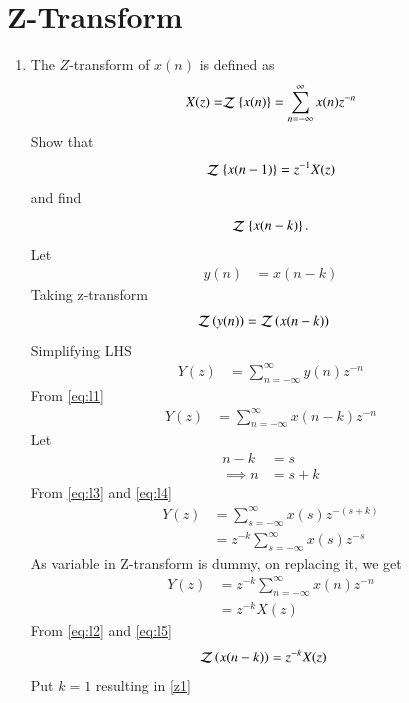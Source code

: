 \documentclass[journal,12pt,twocolumn]{IEEEtran}
\newcommand{\systemZ}[1]{\stackrel{#1}{\mathcal{Z}}}
\theoremstyle{remark}
\begin{document}
\section{Z-Transform}

\begin{enumerate}[label=\thesection.\arabic*]
\item The $Z$-transform of $x(n)$ is defined as
\begin{equation}
X(z)=\systemZ{}\cbrak{x(n)}=\sum _{n=-\infty }^{\infty }x(n)z^{-n} \label{z-transform}
\end{equation}
Show that
\begin{equation}
\systemZ{} \cbrak{x(n-1)} = z^{-1}X(z) \label{z1}
\end{equation}
and find
\begin{equation}
	\systemZ{} \cbrak{x(n-k)}. 
\end{equation}
\solution 
Let
\begin{align}
y(n) &= x(n-k) \label{eq:l1}
\end{align}
Taking z-transform
\begin{align}
\mathcal{Z}\left(y(n)\right) &= \mathcal{Z}\left(x(n-k)\right) \label{eq:l2}
\end{align}
Simplifying LHS
\begin{align}
Y(z) &= \sum_{n=-\infty}^{\infty} y(n)z^{-n} 
\end{align}
From \eqref{eq:l1}
\begin{align}
Y(z) &= \sum_{n=-\infty}^{\infty} x(n-k) z^{-n} \label{eq:l3}
\end{align}
Let 
\begin{align}
n-k &= s  \\\implies
n &= s+k \label{eq:l4}
\end{align}
From \eqref{eq:l3} and \eqref{eq:l4}
\begin{align}
Y(z) &= \sum_{s=-\infty}^{\infty} x(s) z^{-(s+k)} \\
&= z^{-k}\sum_{s=-\infty}^{\infty} x(s) z^{-s} 
\end{align}
As variable in Z-transform is dummy, on replacing it, we get
\begin{align}
Y(z) &= z^{-k}\sum_{n=-\infty}^{\infty} x(n) z^{-n} \\
&= z^{-k}X(z) \label{eq:l5}
\end{align}
From \eqref{eq:l2} and \eqref{eq:l5}
\begin{align}
\mathcal{Z}\left(x(n-k)\right) &= z^{-k}X(z) \label{z2}
\end{align}
Put $k = 1$ resulting in \eqref{z1} \\

\end{enumerate}
\end{document}
